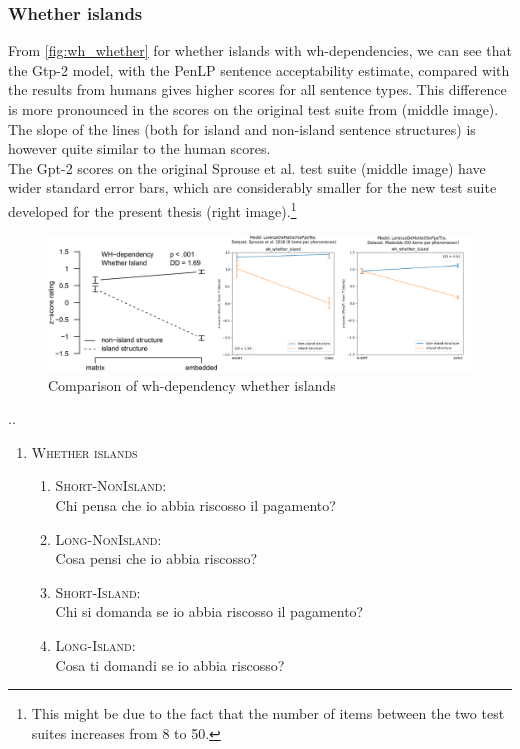 \subsubsection{Whether islands}

From \autoref{fig:wh_whether} for whether islands with wh-dependencies, we can see that the Gtp-2 model, with the PenLP sentence acceptability estimate, compared with the results from humans gives higher scores for all sentence types. This difference is more pronounced in the scores on the original test suite from \citet{sprouse2016experimental} (middle image). The slope of the lines (both for island and non-island sentence structures) is however quite similar to the human scores. \\
The Gpt-2 scores on the original Sprouse et al. test suite (middle image) have wider standard error bars, which are considerably smaller for the new test suite developed for the present thesis (right image).\footnote{This might be due to the fact that the number of items between the two test suites increases from 8 to 50.}

\begin{figure}
	\centering
	\includegraphics[width=1\textwidth]{images/Chapter1/combined_wh-whether.png} %
	\caption{Comparison of wh-dependency whether islands} 
	\label{fig:wh_whether} %
\end{figure}

..
\renewcommand{\labelenumi}{(\arabic{enumi})}
\begin{enumerate}
	\item \textsc{Whether islands}
	\renewcommand{\labelenumii}{\alph{enumii}.}
	\begin{enumerate}
		\item \textsc{Short-NonIsland:} \\
				Chi pensa che io abbia riscosso il pagamento?
		\item \textsc{Long-NonIsland:} \\
				Cosa pensi che io abbia riscosso?
		\item \textsc{Short-Island:} \\
				Chi si domanda se io abbia riscosso il pagamento?
		\item \textsc{Long-Island:} \\				
				Cosa ti domandi se io abbia riscosso?
				
	\end{enumerate}
\end{enumerate}

